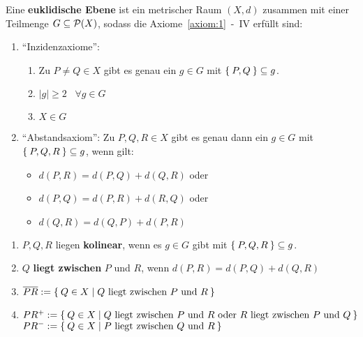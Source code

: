 \begin{definition}%
    Eine \textbf{euklidische Ebene} ist ein metrischer Raum $(X,d)$ 
    zusammen mit einer Teilmenge $G \subseteq \mathcal{P}(X)$, sodass die
    Axiome~\ref{axiom:1}~-~IV erfüllt sind:
    \begin{enumerate}[label=§\arabic*),ref=§\arabic*]
        \item \enquote{Inzidenzaxiome}:\label{axiom:1}
            \begin{enumerate}[label=(\roman*),ref=\theenumi{} (\roman*)]
                \item Zu $P \neq Q \in X$ gibt es genau ein $g \in G$ mit
                      $\Set{P, Q} \subseteq g$.
                \item $|g| \geq 2 \;\;\; \forall g \in G$
                \item $X \in G$
            \end{enumerate}
        \item \enquote{Abstandsaxiom}: Zu $P, Q, R \in X$ gibt es \label{axiom:2}
              genau dann ein $g \in G$ mit $\Set{P, Q, R} \subseteq g$,
              wenn gilt: 
              \begin{itemize}[]
                \item $d(P, R) = d(P, Q) + d(Q, R)$ oder
                \item $d(P, Q) = d(P, R) + d(R, Q)$ oder
                \item $d(Q, R) = d(Q, P) + d(P, R)$
              \end{itemize}
    \end{enumerate}
\end{definition}

\begin{definition}
    \begin{enumerate}[label=\alph*)]
        \item $P, Q, R$ liegen \textbf{kolinear}, 
              wenn es $g \in G$ gibt mit $\Set{P, Q, R} \subseteq g$.
        \item $Q$ \textbf{liegt zwischen} $P$
              und $R$, wenn $d(P, R) = d(P, Q) + d(Q, R)$
        \item $\overline{PR} := \Set{Q \in X | Q \text{ liegt zwischen } P \text{ und } R}$
        \item $PR^+ := \Set{Q \in X | Q \text{ liegt zwischen } P \text{ und } R \text{ oder } R \text{ liegt zwischen } P \text{ und } Q}$\\
              $PR^- := \Set{Q \in X | P \text{ liegt zwischen } Q \text{ und } R}$\\ 
    \end{enumerate}
\end{definition}

